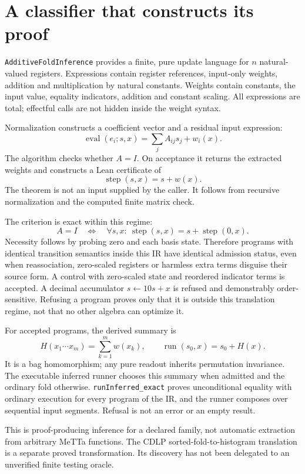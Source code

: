\documentclass[11pt,a4paper]{article}
\newcommand{\code}[1]{\nolinkurl{#1}}
\begin{document}
\section{A classifier that constructs its proof}

\code{AdditiveFoldInference} provides a finite, pure update language for $n$
natural-valued registers. Expressions contain register references, input-only
weights, addition and multiplication by natural constants. Weights contain
constants, the input value, equality indicators, addition and constant scaling.
All expressions are total; effectful calls are not hidden inside the weight
syntax.

Normalization constructs a coefficient vector and a residual input expression:
\[
 \operatorname{eval}(e_i;s,x)=\sum_j A_{ij}s_j+w_i(x).
\]
The algorithm checks whether $A=I$. On acceptance it returns the extracted
weights and constructs a Lean certificate of
\[
 \operatorname{step}(s,x)=s+w(x).
\]
The theorem is not an input supplied by the caller. It follows from recursive
normalization and the computed finite matrix check.

The criterion is exact within this regime:
\[
 A=I\quad\Longleftrightarrow\quad
 \forall s,x:\ \operatorname{step}(s,x)
      =s+\operatorname{step}(0,x).
\]
Necessity follows by probing zero and each basis state. Therefore programs
with identical transition semantics inside this IR have identical admission
status, even when reassociation, zero-scaled registers or harmless extra terms
disguise their source form. A control with zero-scaled state and reordered
indicator terms is accepted. A decimal accumulator $s\gets10s+x$ is refused
and demonstrably order-sensitive. Refusing a program proves only that it is
outside this translation regime, not that no other algebra can optimize it.

For accepted programs, the derived summary is
\[
 H(x_1\cdots x_m)=\sum_{k=1}^m w(x_k),\qquad
 \operatorname{run}(s_0,x)=s_0+H(x).
\]
It is a bag homomorphism; any pure readout inherits permutation invariance.
The executable inferred runner chooses this summary when admitted and the
ordinary fold otherwise. \code{runInferred_exact} proves unconditional equality
with ordinary execution for every program of the IR, and the runner composes
over sequential input segments. Refusal is not an error or an empty result.

This is proof-producing inference for a declared family, not automatic
extraction from arbitrary MeTTa functions. The CDLP sorted-fold-to-histogram
translation is a separate proved transformation. Its discovery has not been
delegated to an unverified finite testing oracle.
\end{document}
